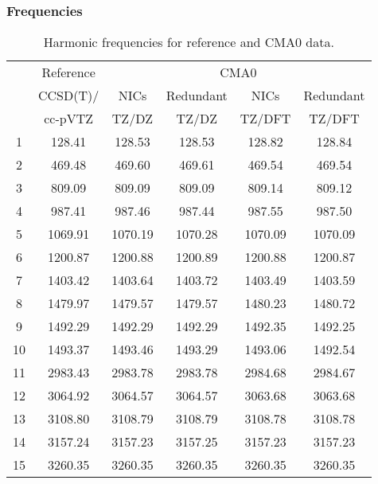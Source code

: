 \documentclass[10pt,oneside]{article}
\begin{document}
\begin{table}[h!]
\subsubsection*{Frequencies}
\centering
\caption{Harmonic frequencies for reference and CMA0 data.}
\begin{tabular}{cccccc}
\toprule
{} & Reference & \multicolumn{4}{c}{CMA0} \\
{} &  CCSD(T)/ &    NICs &  Redundant &    NICs & Redundant \\
{} &   cc-pVTZ &   TZ/DZ &      TZ/DZ &  TZ/DFT &    TZ/DFT \\
\midrule
1  &    128.41 &  128.53 &     128.53 &  128.82 &    128.84 \\
2  &    469.48 &  469.60 &     469.61 &  469.54 &    469.54 \\
3  &    809.09 &  809.09 &     809.09 &  809.14 &    809.12 \\
4  &    987.41 &  987.46 &     987.44 &  987.55 &    987.50 \\
5  &   1069.91 & 1070.19 &    1070.28 & 1070.09 &   1070.09 \\
6  &   1200.87 & 1200.88 &    1200.89 & 1200.88 &   1200.87 \\
7  &   1403.42 & 1403.64 &    1403.72 & 1403.49 &   1403.59 \\
8  &   1479.97 & 1479.57 &    1479.57 & 1480.23 &   1480.72 \\
9  &   1492.29 & 1492.29 &    1492.29 & 1492.35 &   1492.25 \\
10 &   1493.37 & 1493.46 &    1493.29 & 1493.06 &   1492.54 \\
11 &   2983.43 & 2983.78 &    2983.78 & 2984.68 &   2984.67 \\
12 &   3064.92 & 3064.57 &    3064.57 & 3063.68 &   3063.68 \\
13 &   3108.80 & 3108.79 &    3108.79 & 3108.78 &   3108.78 \\
14 &   3157.24 & 3157.23 &    3157.25 & 3157.23 &   3157.23 \\
15 &   3260.35 & 3260.35 &    3260.35 & 3260.35 &   3260.35 \\
\bottomrule
\end{tabular}
\end{table}
\end{document}
